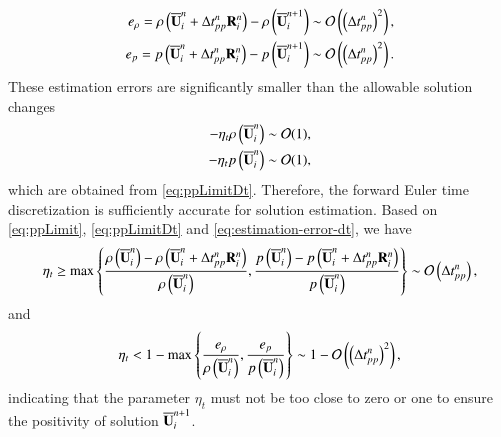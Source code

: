 \begin{equation}
\label{eq:estimation-error-dt}
\begin{aligned}
    e_\rho= \rho\left( \overline{\mathbf{U}}_i^{n} + \mathrm\Delta t^{n}_{pp}\mathbf{R}_i^n \right) - \rho\left( \overline{\mathbf{U}}_i^{n+1}\right) \sim \mathcal{O}\left(\left(\mathrm\Delta t^{n}_{pp}\right)^2\right),\\ 
    e_p= p\left( \overline{\mathbf{U}}_i^{n} + \mathrm\Delta t^{n}_{pp}\mathbf{R}_i^n \right) - p\left( \overline{\mathbf{U}}_i^{n+1}\right) \sim \mathcal{O}\left(\left(\mathrm\Delta t^{n}_{pp}\right)^2\right).
\end{aligned}
\end{equation}
These estimation errors are significantly smaller than the allowable solution changes
\begin{equation}
    \begin{aligned}
        -\eta_t \rho\left(\overline{\mathbf{U}}_i^n\right) \sim \mathcal{O}(1), \\
        -\eta_t p\left(\overline{\mathbf{U}}_i^n\right) \sim \mathcal{O}(1),
    \end{aligned}
\end{equation}
which are obtained from \eqref{eq:ppLimitDt}.
Therefore, the forward Euler time discretization is sufficiently accurate for solution estimation.
Based on \eqref{eq:ppLimit}, \eqref{eq:ppLimitDt} and \eqref{eq:estimation-error-dt}, we have
\begin{equation}
    \eta_t \geq \max \left\{\dfrac{\rho\left(\overline{\mathbf{U}}_i^n\right)-\rho\left( \overline{\mathbf{U}}_i^{n} + \mathrm\Delta t^{n}_{pp}\mathbf{R}_i^n \right)}{\rho\left(\overline{\mathbf{U}}_i^n\right)}, \dfrac{p\left(\overline{\mathbf{U}}_i^n\right)-p\left( \overline{\mathbf{U}}_i^{n} + \mathrm\Delta t^{n}_{pp}\mathbf{R}_i^n \right)}{p\left(\overline{\mathbf{U}}_i^n\right)} \right\} \sim \mathcal{O} \left(\mathrm\Delta t^{n}_{pp}\right),
\end{equation}
and
\begin{equation}
    \eta_t < 1- \max \left\{\dfrac{e_\rho}{\rho\left(\overline{\mathbf{U}}_i^n\right)}, \dfrac{e_p}{p\left(\overline{\mathbf{U}}_i^n\right)} \right\} \sim 1- \mathcal{O}\left(\left(\mathrm\Delta t^{n}_{pp}\right)^2\right),
\end{equation}
indicating that the parameter $\eta_t$ must not be too close to zero or one to ensure the positivity of solution $\overline{\mathbf{U}}_i^{n+1}$. 

